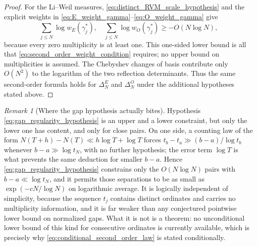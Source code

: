 \documentclass[11pt]{amsart}
\numberwithin{equation}{section}
\theoremstyle{plain}
\theoremstyle{definition}
\theoremstyle{remark}
\newtheorem{remark}[theorem]{Remark}
\begin{document}
\begin{proof}
For the Li--Weil measures, \eqref{eq:distinct_RVM_scale_hypothesis} and the explicit weights in \eqref{eq:E_weight_gamma}--\eqref{eq:O_weight_gamma} give
\begin{equation}
\sum_{j\le N}\log w_{E}(\gamma_j^*),
\quad
\sum_{j\le N}\log w_{O}(\gamma_j^*)
\ge -O(N\log N),
\end{equation}
because every zero multiplicity is at least one.  This one-sided lower bound is all that
\eqref{eq:second_order_weight_condition} requires; no upper bound on multiplicities is assumed.  The Chebyshev changes of basis contribute only $O(N^2)$ to the logarithm of the two reflection determinants.  Thus the same second-order formula holds for $\Delta_N^E$ and $\Delta_N^O$ under the additional hypotheses stated above.
\end{proof}

\begin{remark}[Where the gap hypothesis actually bites]
\label{rem:gap_hypothesis_localised}
Hypothesis \eqref{eq:gap_regularity_hypothesis} is an upper and a lower constraint, but only the lower one has content, and only for close pairs. On one side, a counting law of the form $N(T+h)-N(T)\ll h\log T+\log T$ forces $t_b-t_a\gg(b-a)/\log t_b$ whenever $b-a\gg\log t_N$, with no further hypothesis; the error term $\log T$ is what prevents the same deduction for smaller $b-a$. Hence \eqref{eq:gap_regularity_hypothesis} constrains only the $O(N\log N)$ pairs with $b-a\ll\log t_N$, and it permits those separations to be as small as $\exp(-cN/\log N)$ on logarithmic average. It is logically independent of simplicity, because the sequence \(t_j\) contains distinct ordinates and carries no multiplicity information, and it is far weaker than any conjectured pointwise lower bound on normalized gaps. What it is not is a theorem: no unconditional lower bound of this kind for consecutive ordinates is currently available, which is precisely why \eqref{eq:conditional_second_order_law} is stated conditionally.
\end{remark}
\end{document}
